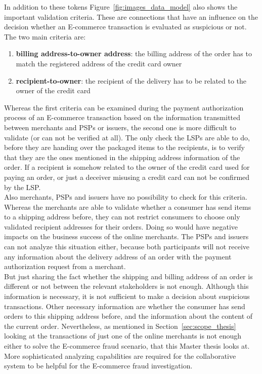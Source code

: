 In addition to these tokens Figure~\ref{fig:images_data_model} also shows the important validation criteria. These are connections that have an influence on the decision whether an \gls{E-commerce} transaction is evaluated as suspicious or not. The two main criteria are: \@

\begin{enumerate}
  \item \textbf{billing address-to-owner address}: the billing address of the order has to match the registered address of the credit card owner
  \item \textbf{recipient-to-owner}: the recipient of the delivery has to be related to the owner of the credit card
\end{enumerate}

Whereas the first criteria can be examined during the payment authorization process of an \gls{E-commerce} transaction based on the information transmitted between merchants and \gls{PSP}s or issuers, the second one is more difficult to validate (or can not be verified at all). The only check the \gls{LSP}s are able to do, before they are handing over the packaged items to the recipients, is to verify that they are the ones mentioned in the shipping address information of the order. If a recipient is somehow related to the owner of the credit card used for paying an order, or just a deceiver misusing a credit card can not be confirmed by the \gls{LSP}. \\

Also merchants, \gls{PSP}s and issuers have no possibility to check for this criteria. Whereas the merchants are able to validate whether a consumer has send items to a shipping address before, they can not restrict consumers to choose only validated recipient addresses for their orders. Doing so would have negative impacts on the business success of the online merchants. The \gls{PSP}s and issuers can not analyze this situation either, because both participants will not receive any information about the delivery address of an order with the payment authorization request from a merchant. \\

But just sharing the fact whether the shipping and billing address of an order is different or not between the relevant stakeholders is not enough. Although this information is necessary, it is not sufficient to make a decision about suspicious transactions. Other necessary information are whether the consumer has send orders to this shipping address before, and the information about the content of the current order. Nevertheless, as mentioned in Section~\ref{sec:scope_thesis} looking at the transactions of just one of the online merchants is not enough either to solve the \gls{E-commerce} fraud scenario, that this Master thesis looks at. More sophisticated analyzing capabilities are required for the collaborative system to be helpful for the \gls{E-commerce} fraud investigation.


